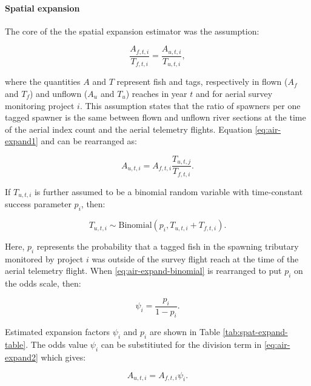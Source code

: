 \documentclass[12pt,]{book}
\let\oldparagraph\paragraph
\renewcommand{\paragraph}[1]{\oldparagraph{#1}\mbox{}}
\theoremstyle{definition}
\theoremstyle{definition}
\theoremstyle{definition}
\theoremstyle{remark}
\begin{document}
\paragraph{Spatial expansion}\label{spat-expansion}

\noindent
The core of the the spatial expansion estimator was the assumption:

\begin{equation}
  \frac{A_{f,t,i}}{T_{f,t,i}} = \frac{A_{u,t,i}}{T_{u,t,i}},
  \label{eq:air-expand1}
\end{equation}

\noindent
where the quantities \(A\) and \(T\) represent fish and tags,
respectively in flown (\(A_f\) and \(T_f\)) and unflown (\(A_u\) and
\(T_u\)) reaches in year \(t\) and for aerial survey monitoring project
\(i\). This assumption states that the ratio of spawners per one tagged
spawner is the same between flown and unflown river sections at the time
of the aerial index count and the aerial telemetry flights. Equation
\eqref{eq:air-expand1} and can be rearranged as:

\begin{equation}
  A_{u,t,i} = A_{f,t,i} \frac{T_{u,t,j}}{T_{f,t,i}}.
  \label{eq:air-expand2}
\end{equation}

\noindent
If \(T_{u,t,i}\) is further assumed to be a binomial random variable
with time-constant success parameter \(p_i\), then:

\begin{equation}
  T_{u,t,i} \sim \text{Binomial}(p_i,T_{u,t,i} + T_{f,t,i}).
  \label{eq:air-expand-binomial}
\end{equation}

\noindent
Here, \(p_i\) represents the probability that a tagged fish in the
spawning tributary monitored by project \(i\) was outside of the survey
flight reach at the time of the aerial telemetry flight. When
\eqref{eq:air-expand-binomial} is rearranged to put \(p_i\) on the odds
scale, then:

\begin{equation}
  \psi_i=\frac{p_i}{1-p_i}.
  \label{eq:air-expand-odds}
\end{equation}

\noindent
Estimated expansion factors \(\psi_i\) and \(p_i\) are shown in Table
\ref{tab:spat-expand-table}. The odds value \(\psi_i\) can be
substitiuted for the division term in \eqref{eq:air-expand2} which gives:

\begin{equation}
  A_{u,t,i} = A_{f,t,i} \psi_i.
  \label{eq:air-expand3}
\end{equation}
\end{document}
